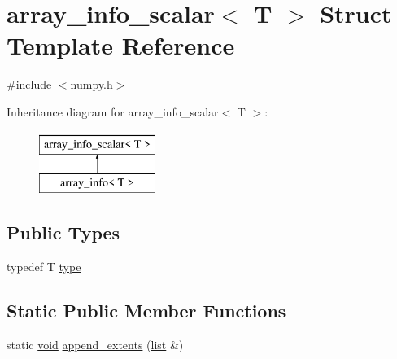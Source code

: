\hypertarget{structarray__info__scalar}{}\section{array\+\_\+info\+\_\+scalar$<$ T $>$ Struct Template Reference}
\label{structarray__info__scalar}


{\ttfamily \#include $<$numpy.\+h$>$}

Inheritance diagram for array\+\_\+info\+\_\+scalar$<$ T $>$\+:\begin{figure}[H]
\begin{center}
\leavevmode
\includegraphics[height=2.000000cm]{structarray__info__scalar}
\end{center}
\end{figure}
\subsection*{Public Types}
\begin{DoxyCompactItemize}
\item 
typedef T \mbox{\hyperlink{structarray__info__scalar_a095b43f154578da44d1206e35d81cef4}{type}}
\end{DoxyCompactItemize}
\subsection*{Static Public Member Functions}
\begin{DoxyCompactItemize}
\item 
static \mbox{\hyperlink{_s_d_l__opengles2__gl2ext_8h_ae5d8fa23ad07c48bb609509eae494c95}{void}} \mbox{\hyperlink{structarray__info__scalar_ae04c8e13cf1152eda868be73d269f801}{append\+\_\+extents}} (\mbox{\hyperlink{classlist}{list}} \&)
\end{DoxyCompactItemize}
